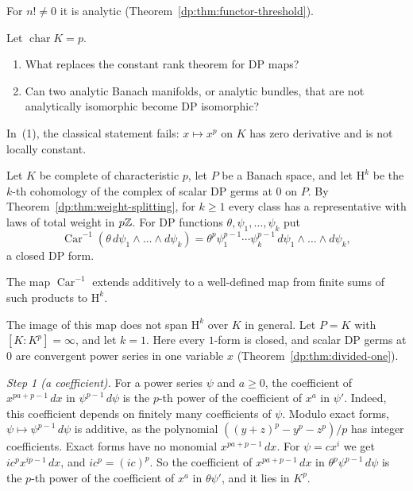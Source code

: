 For $n!\ne0$ it is analytic (Theorem~\ref{dp:thm:functor-threshold}).

\begin{question}\label{dp:q:forms}
Let $\operatorname{char}K=p$.
\begin{enumerate}
\item What replaces the constant rank theorem for DP maps?
\item Can two analytic Banach manifolds, or analytic bundles, that are not analytically isomorphic become DP isomorphic?
\end{enumerate}
\end{question}

In~(1), the classical statement fails: $x\mapsto x^p$ on $K$ has zero derivative and is not locally constant.

Let $K$ be complete of characteristic $p$, let $P$ be a Banach space, and let $\mathrm H^k$ be the $k$-th cohomology of the complex of scalar DP germs at $0$ on $P$. By Theorem~\ref{dp:thm:weight-splitting}, for $k\ge1$ every class has a representative with laws of total weight in $p\mathbb Z$. For DP functions $\theta,\psi_1,\dots,\psi_k$ put
\[
 \operatorname{Car}^{-1}(\theta\,d\psi_1\wedge\dots\wedge d\psi_k)=\theta^p\psi_1^{p-1}\cdots\psi_k^{p-1}\,d\psi_1\wedge\dots\wedge d\psi_k,
\]
a closed DP form.

\begin{conjecture}\label{dp:conj:cartier}
The map $\operatorname{Car}^{-1}$ extends additively to a well-defined map from finite sums of such products to $\mathrm H^k$.
\end{conjecture}

The image of this map does not span $\mathrm H^k$ over $K$ in general. Let $P=K$ with $[K:K^p]=\infty$, and let $k=1$. Here every $1$-form is closed, and scalar DP germs at $0$ are convergent power series in one variable $x$ (Theorem~\ref{dp:thm:divided-one}).

\emph{Step 1 (a coefficient).} For a power series $\psi$ and $a\ge0$, the coefficient of $x^{pa+p-1}\,dx$ in $\psi^{p-1}\,d\psi$ is the $p$-th power of the coefficient of $x^a$ in $\psi'$. Indeed, this coefficient depends on finitely many coefficients of $\psi$. Modulo exact forms, $\psi\mapsto\psi^{p-1}\,d\psi$ is additive, as the polynomial $((y+z)^p-y^p-z^p)/p$ has integer coefficients. Exact forms have no monomial $x^{pa+p-1}\,dx$. For $\psi=cx^i$ we get $ic^px^{ip-1}\,dx$, and $ic^p=(ic)^p$. So the coefficient of $x^{pa+p-1}\,dx$ in $\theta^p\psi^{p-1}\,d\psi$ is the $p$-th power of the coefficient of $x^a$ in $\theta\psi'$, and it lies in $K^p$.

